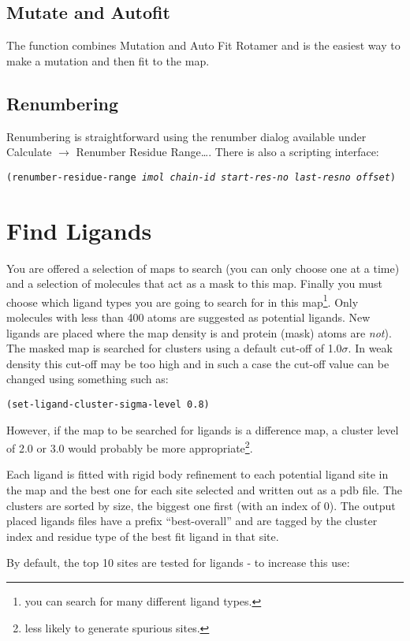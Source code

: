 \documentclass{book}
\begin{document}
\subsection{Mutate and Autofit}
The function combines Mutation and Auto Fit Rotamer and is the easiest
way to make a mutation and then fit to the map.

\subsection{Renumbering}
Renumbering is straightforward using the
renumber dialog available under \textsf{Calculate $\rightarrow$
  Renumber Residue Range\ldots}.  There is also a scripting interface:

\texttt{(renumber-residue-range \emph{imol chain-id start-res-no
    last-resno offset})}

\section{Find Ligands}
 You are offered a selection of maps to search (you can
only choose one at a time) and a selection of molecules that act as a
mask to this map.  Finally you must choose which ligand types you are
going to search for in this map\footnote{you can search for many
  different ligand types.}.  Only molecules with less than 400 atoms
are suggested as potential ligands.  New ligands are placed where the
map density is and protein (mask) atoms are \emph{not}).  The masked
map is searched for clusters using a default cut-off of 1.0$\sigma$.
In weak density this cut-off may be too high and in such a case the
cut-off value can be changed using something such as:

\texttt{(set-ligand-cluster-sigma-level 0.8)}

However, if the map to be searched for ligands is a difference map, a
cluster level of 2.0 or 3.0 would probably be more
appropriate\footnote{less likely to generate spurious sites.}.

Each ligand is fitted with rigid body refinement to each potential
ligand site in the map and the best one for each site selected and
written out as a pdb file.  The clusters are sorted by size, the
biggest one first (with an index of 0).  The output placed ligands
files have a prefix ``best-overall'' and are tagged by the cluster
index and residue type of the best fit ligand in that site.

By default, the top 10 sites are tested for ligands - to increase this
use:
\end{document}
